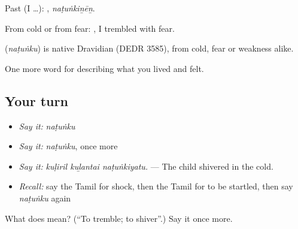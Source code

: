 Past (I …): , \emph{naṭuṅkiṉēṉ}.

From cold or from fear:  , I trembled with fear.

\begin{cousinweb}
\textbf{} (\emph{naṭuṅku}) is native Dravidian (DEDR 3585), from cold, fear or weakness alike.
\end{cousinweb}

\begin{grammarlens}[title={What you've built}]
One more word for describing what you lived and felt.
\end{grammarlens}

\subsection*{Your turn}
\begin{itemize}
\raggedright
  \item \emph{Say it:} \emph{naṭuṅku}
  \item \emph{Say it:} \emph{naṭuṅku}, once more
  \item \emph{Say it:} \emph{kuḷiril kuḻantai naṭuṅkiyatu.} — The child shivered in the cold.
  \item \emph{Recall:} say the Tamil for shock, then the Tamil for to be startled, then say \emph{naṭuṅku} again
\end{itemize}

\begin{tcolorbox}[breakable,colback=teal!4,colframe=teal!35!black,title={Before you move on}]
What does  mean? (\textquotedblleft{}To tremble; to shiver\textquotedblright{}.) Say it once more.
\end{tcolorbox}
